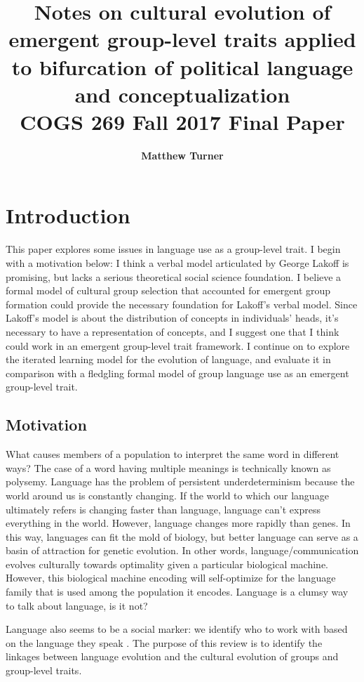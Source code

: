 \documentclass[11pt,letterpaper]{article}
\title{Notes on cultural evolution of emergent group-level traits applied to 
  bifurcation of political language and conceptualization \\ {\small COGS 269 Fall 2017 Final Paper}}
\author{{\bf Matthew Turner}}
\begin{document}
\maketitle

\section{Introduction}\label{intro}

This paper explores some issues in language use as a group-level trait. 
I begin with a motivation below: I think a verbal model 
articulated by George Lakoff is promising, but lacks a serious theoretical
social science foundation. I believe a formal model of cultural
group selection that accounted for emergent group formation could provide
the necessary foundation for Lakoff's verbal model. Since Lakoff's model 
is about the distribution of concepts in individuals' heads, it's necessary
to have a representation of concepts, and I suggest one that I think could work
in an emergent group-level trait framework. I continue on to explore the 
iterated learning model for the evolution of language, and evaluate it in 
comparison with a fledgling formal model of group language use as an
emergent group-level trait.

\subsection{Motivation} \label{motivation}

What causes members of a population to interpret the same 
word in different ways? The case of a word having multiple meanings is 
technically known as polysemy. Language has the problem of persistent 
underdeterminism because the world around us is constantly changing. If 
the world to which our language ultimately refers is changing faster than
language, language can't express everything in the world. However, language
changes more rapidly than genes. In this way, languages can fit the mold of
biology, but better language can serve as a basin of attraction for genetic
evolution. In other words, language/communication evolves culturally 
towards optimality given a particular biological machine. However, this 
biological machine encoding will self-optimize for the language family that 
is used among the population it encodes. 
Language is a clumsy way to talk about language, is it not? 

Language also seems
to be a social marker: we identify who to work with based on the language they
speak \cite{Smaldino2017b}. 
The purpose of this review is to identify the linkages between language evolution
and the cultural evolution of groups and group-level traits.
\end{document}
